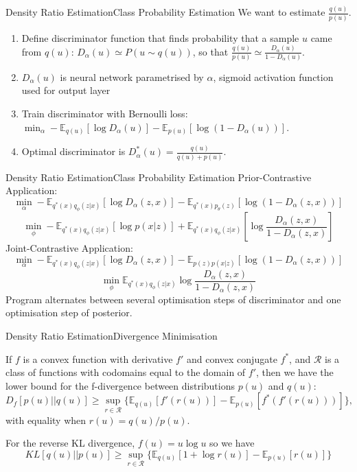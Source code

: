 \documentclass{beamer}
\begin{document}
\begin{frame}{Density Ratio Estimation}{Class Probability Estimation}
We want to estimate $\frac{q(u)}{p(u)}$.
  \begin{enumerate}
  \item {
    Define discriminator function that finds probability that a sample $u$ came from $q(u)$: $D_\alpha(u)\simeq P(u\sim q(u))$, so that $\frac{q(u)}{p(u)}\simeq \frac{D_\alpha(u)}{1-D_\alpha(u)}$.
  }
  \item $D_\alpha(u)$ is neural network parametrised by $\alpha$, sigmoid activation function used for output layer
  \item {
    Train discriminator with Bernoulli loss: $\min_\alpha -\mathbb{E}_{q(u)}[\log D_\alpha(u)]-\mathbb{E}_{p(u)}[\log(1-D_\alpha(u))]$.
  }
  \item Optimal discriminator is $D^*_\alpha(u)=\frac{q(u)}{q(u)+p(u)}$.
  \end{enumerate}
\end{frame}
\begin{frame}{Density Ratio Estimation}{Class Probability Estimation}
Prior-Contrastive Application:
\[\min_\alpha -\mathbb{E}_{q^*(x)q_\phi(z|x)}[\log D_\alpha(z,x)]-\mathbb{E}_{q^*(x)p_\theta(z)}[\log (1-D_\alpha(z,x))]\]
\[\min_\phi -\mathbb{E}_{q^*(x)q_\phi(z|x)}[\log p(x|z)]+\mathbb{E}_{q^*(x)q_\phi(z|x)}\left[\log \frac{D_\alpha(z,x)}{1-D_\alpha(z,x)}\right]\]
Joint-Contrastive Application:
\[\min_\alpha -\mathbb{E}_{q^*(x)q_\phi(z|x)}[\log D_\alpha(z,x)]-\mathbb{E}_{p(z)p(x|z)}[\log (1-D_\alpha(z,x))]\]
\[\min_\phi \mathbb{E}_{q^*(x)q_\phi(z|x)}\log\frac{D_\alpha(z,x)}{1-D_\alpha(z,x)}\]
Program alternates between several optimisation steps of discriminator and one optimisation step of posterior.
\end{frame}
\begin{frame}{Density Ratio Estimation}{Divergence Minimisation}
\begin{theorem}
If $f$ is a convex function with derivative $f'$ and convex conjugate $f^*$, and $\mathcal{R}$ is a class of functions with codomains equal to the domain of $f'$, then we have the lower bound for the f-divergence between distributions $p(u)$ and $q(u)$:
\[D_f [p(u)||q(u)]\geq \sup_{r\in \mathcal{R}} \{\mathbb{E}_{q(u)}[f'(r(u))]-\mathbb{E}_{p(u)}[f^*(f'(r(u)))]\},\]
with equality when $r(u)=q(u)/p(u)$.
\end{theorem}
For the reverse KL divergence, $f(u)=u\log u$ so we have
\[KL[q(u)||p(u)]\geq \sup_{r\in \mathcal{R}}\{\mathbb{E}_{q(u)}[1+\log r(u)]-\mathbb{E}_{p(u)}[r(u)]\}\]

\end{frame}
\end{document}
